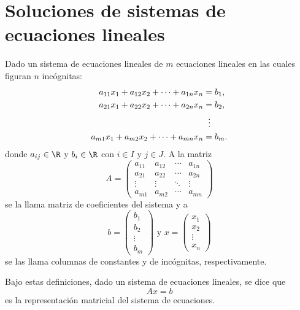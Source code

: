 \documentclass[a4,11pt]{aleph-notas}
\begin{document}
\encabezado

\section{Soluciones de sistemas de ecuaciones lineales}
\begin{defi}
    Dado un sistema de ecuaciones lineales de $m$ ecuaciones lineales en las cuales figuran $n$ incógnitas:
    \begin{align*}
        a_{11}x_1 + a_{12}x_2 + \cdots + a_{1n}x_n &= b_1,\\
        a_{21}x_1 + a_{22}x_2 + \cdots + a_{2n}x_n &= b_2,\\
            & \hspace{2mm} \vdots\\
        a_{m1}x_1 + a_{m2}x_2 + \cdots + a_{mn}x_n &= b_m.
    \end{align*}
    donde $a_{ij}\in\R$ y $b_i\in \R$ con $i\in I$ y $j\in J$. A la matriz
    \[
        A=\begin{pmatrix}
        a_{11} & a_{12} & \cdots & a_{1n}\\
        a_{21} & a_{22} & \cdots & a_{2n}\\
        \vdots & \vdots & \ddots & \vdots\\
        a_{m1} & a_{m2} & \cdots & a_{mn}
        \end{pmatrix}
    \]
    se la llama matriz de coeficientes del sistema y a 
    \[
        b=\begin{pmatrix}
        b_1 \\ b_2 \\ \vdots \\ b_m
        \end{pmatrix}
        \text{ y }
        x=\begin{pmatrix}
        x_1 \\ x_2 \\ \vdots \\ x_n
        \end{pmatrix}
    \]
    se las llama columnas de constantes y de incógnitas, respectivamente.
\end{defi}

\begin{advertencia}
    Bajo estas definiciones, dado un sistema de ecuaciones lineales, se dice que
    \[
        Ax=b
    \]
    es la representación matricial del sistema de ecuaciones.
\end{advertencia}
\end{document}
